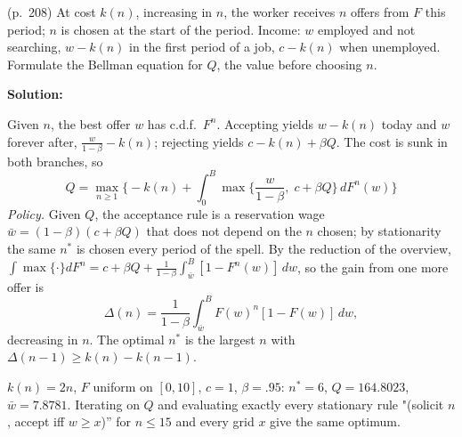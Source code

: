 \documentclass[12pt, letterpaper]{article}
\newcommand{\wb}{\bar w}
\begin{document}
\begin{tcolorbox}[oddbox,title={Exercise 6.5 \quad Choosing the Number of Offers}]
\begin{tcolorbox}[questionbox]
(p.~208) At cost $k(n)$, increasing in $n$, the worker receives $n$ offers from $F$ this period; $n$ is chosen
at the start of the period. Income: $w$ employed and not searching, $w-k(n)$ in the first period of a job,
$c-k(n)$ when unemployed. Formulate the Bellman equation for $Q$, the value before choosing $n$.
\end{tcolorbox}

\textbf{Solution:}

Given $n$, the best offer $w$ has c.d.f.\ $F^n$. Accepting yields $w-k(n)$ today and $w$ forever after,
$\frac{w}{1-\beta}-k(n)$; rejecting yields $c-k(n)+\beta Q$. The cost is sunk in both branches, so
\[
\boxed{Q=\max_{n\ge1}\Big\{-k(n)+\int_0^B\max\Big\{\frac{w}{1-\beta},\;c+\beta Q\Big\}\,dF^n(w)\Big\}}
\]
\emph{Policy.} Given $Q$, the acceptance rule is a reservation wage $\wb=(1-\beta)(c+\beta Q)$ that does not
depend on the $n$ chosen; by stationarity the same $n^*$ is chosen every period of the spell. By the
reduction of the overview, $\int\max\{\cdot\}dF^n=c+\beta Q+\frac1{1-\beta}\int_{\wb}^B[1-F^n(w)]\,dw$, so the
gain from one more offer is
\[
\Delta(n)=\frac{1}{1-\beta}\int_{\wb}^BF(w)^n[1-F(w)]\,dw,
\]
decreasing in $n$. The optimal $n^*$ is the largest $n$ with $\Delta(n-1)\ge k(n)-k(n-1)$.

\begin{tcolorbox}[databox]
$k(n)=2n$, $F$ uniform on $[0,10]$, $c=1$, $\beta=.95$: $n^*=6$, $Q=164.8023$, $\wb=7.8781$. Iterating on $Q$ and
evaluating exactly every stationary rule "(solicit $n$, accept iff $w\ge x$)'' for $n\le15$ and every grid
$x$ give the same optimum.
\end{tcolorbox}
\end{tcolorbox}
\end{document}
